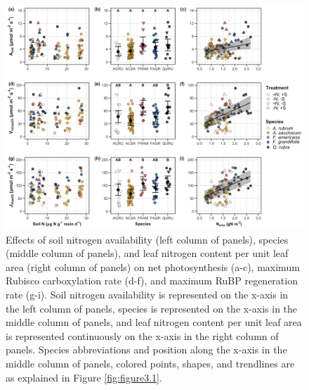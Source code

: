 \newpage
\begin{figure}
    \includegraphics[width=\textwidth]{ch3_NxpH/figs/NxS_fig2_leafbiochem.jpg}
    \centering
    \caption[Effects of soil nitrogen availability, species, and leaf nitrogen content on net photosynthesis, maximum Rubisco carboxylation rate, and maximum RuBP regeneration rate]{Effects of soil nitrogen availability (left column of panels), species (middle column of panels), and leaf nitrogen content per unit leaf area (right column of panels) on net photosynthesis (a-c), maximum Rubisco carboxylation rate (d-f), and maximum RuBP regeneration rate (g-i). Soil nitrogen availability is represented on the x-axis in the left column of panels, species is represented on the x-axis in the middle column of panels, and leaf nitrogen content per unit leaf area is represented continuously on the x-axis in the right column of panels. Species abbreviations and position along the x-axis in the middle column of panels, colored points, shapes, and trendlines are as explained in Figure \ref{fig:figure3.1}.}
    \label{fig:figure3.2}
\end{figure}
\clearpage

\newpage
